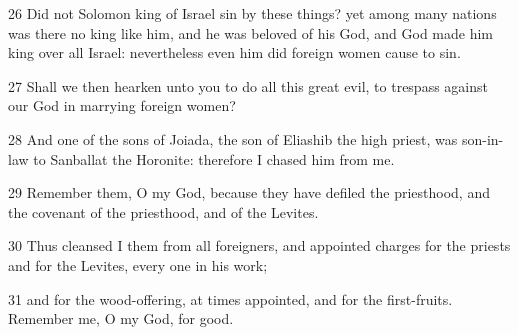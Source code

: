 \par 26 Did not Solomon king of Israel sin by these things? yet among many nations was there no king like him, and he was beloved of his God, and God made him king over all Israel: nevertheless even him did foreign women cause to sin.
\par 27 Shall we then hearken unto you to do all this great evil, to trespass against our God in marrying foreign women?
\par 28 And one of the sons of Joiada, the son of Eliashib the high priest, was son-in-law to Sanballat the Horonite: therefore I chased him from me.
\par 29 Remember them, O my God, because they have defiled the priesthood, and the covenant of the priesthood, and of the Levites.
\par 30 Thus cleansed I them from all foreigners, and appointed charges for the priests and for the Levites, every one in his work;
\par 31 and for the wood-offering, at times appointed, and for the first-fruits. Remember me, O my God, for good.

